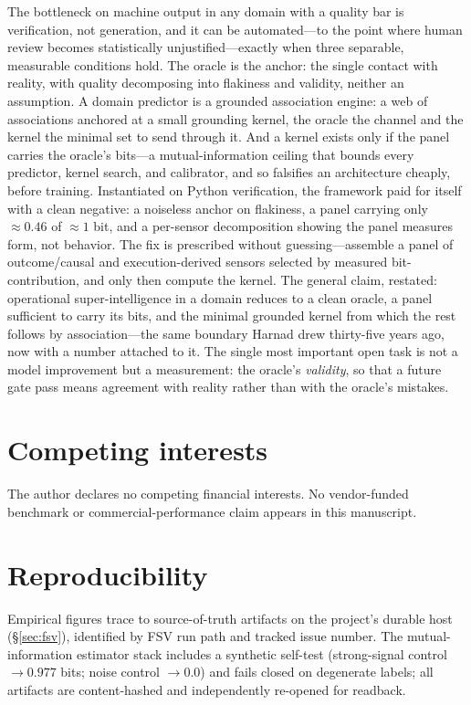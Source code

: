 \documentclass[10pt,twocolumn]{article}
\begin{document}
The bottleneck on machine output in any domain with a quality bar is verification,
not generation, and it can be automated---to the point where human review becomes
statistically unjustified---exactly when three separable, measurable conditions
hold. The oracle is the anchor: the single contact with reality, with quality
decomposing into flakiness and validity, neither an assumption. A domain predictor
is a grounded association engine: a web of associations anchored at a small
grounding kernel, the oracle the channel and the kernel the minimal set to send
through it. And a kernel exists only if the panel carries the oracle's bits---a
mutual-information ceiling that bounds every predictor, kernel search, and
calibrator, and so falsifies an architecture cheaply, before training. Instantiated
on Python verification, the framework paid for itself with a clean negative: a
noiseless anchor on flakiness, a panel carrying only $\approx0.46$ of $\approx1$
bit, and a per-sensor decomposition showing the panel measures form, not behavior.
The fix is prescribed without guessing---assemble a panel of outcome/causal and
execution-derived sensors selected by measured bit-contribution, and only then
compute the kernel. The general claim, restated: operational super-intelligence in
a domain reduces to a clean oracle, a panel sufficient to carry its bits, and the
minimal grounded kernel from which the rest follows by association---the same
boundary Harnad drew thirty-five years ago, now with a number attached to it. The
single most important open task is not a model improvement but a measurement: the
oracle's \emph{validity}, so that a future gate pass means agreement with reality
rather than with the oracle's mistakes.

\section*{Competing interests}
The author declares no competing financial interests. No vendor-funded benchmark
or commercial-performance claim appears in this manuscript.

\section*{Reproducibility}
Empirical figures trace to source-of-truth artifacts on the project's durable
host (\S\ref{sec:fsv}), identified by FSV run path and tracked issue number. The
mutual-information estimator stack includes a synthetic self-test (strong-signal
control $\to0.977$ bits; noise control $\to0.0$) and fails closed on degenerate
labels; all artifacts are content-hashed and independently re-opened for readback.
\end{document}
